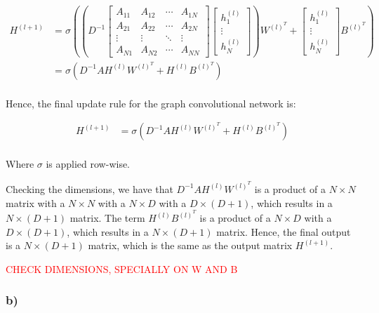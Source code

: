 \documentclass{article}
\begin{document}
\begin{align*}
    H^{(l+1)} & = \sigma \left( \left(
        D^{-1}
        \begin{bmatrix}
        A_{11} & A_{12} & \cdots & A_{1N} \\
        A_{21} & A_{22} & \cdots & A_{2N} \\
        \vdots & \vdots & \ddots & \vdots \\
        A_{N1} & A_{N2} & \cdots & A_{NN}
    \end{bmatrix}
    \begin{bmatrix}
        h_1^{(l)} \\
        \vdots \\
        h_N^{(l)}
    \end{bmatrix}
    \right) W^{(l)^T} + \begin{bmatrix}
        h_1^{(l)} \\
        \vdots \\
        h_N^{(l)}
    \end{bmatrix} B^{(l)^T}
    \right) \\
    &=
    \sigma \left(
        D^{-1} A H^{(l)} W^{(l)^T}
     + H^{(l)} B^{(l)^T}
    \right) \\
\end{align*}

Hence, the final update rule for the graph convolutional network is:

\begin{align*}
    H^{(l+1)} & = \sigma \left(
        D^{-1} A H^{(l)} W^{(l)^T}
     + H^{(l)} B^{(l)^T}
    \right) \\
\end{align*}

Where $\sigma$ is applied row-wise.

Checking the dimensions, we have that $D^{-1} A H^{(l)} W^{(l)^T}$ is a product of a $N \times N$ matrix with a $N \times N$ with a $N \times D$ with a $D \times (D + 1)$,
which results in a $N \times (D + 1)$ matrix. The term $H^{(l)} B^{(l)^T}$ is a product of a $N \times D$ with a $D \times (D + 1)$, which results in a $N \times (D + 1)$ matrix.
Hence, the final output is a $N \times (D + 1)$ matrix, which is the same as the output matrix $H^{(l + 1)}$.

\textcolor{red}{CHECK DIMENSIONS, SPECIALLY ON W AND B}

\subsubsection*{b)}
\end{document}
